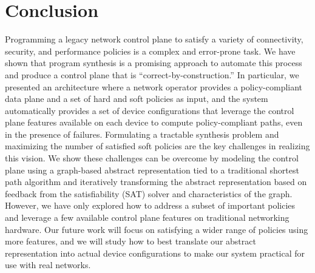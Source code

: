 \section{Conclusion}
Programming a legacy network control plane to satisfy a variety of
connectivity, security, and performance policies is a complex and error-prone
task. We have shown that program synthesis is a promising approach to automate
this process and produce a control plane that is ``correct-by-construction.''
In particular, we presented an architecture where a network operator provides
a policy-compliant data plane and a set of hard and soft policies as input,
and the system automatically provides a set of device configurations that
leverage the control plane features available on each device to compute
policy-compliant paths, even in the presence of failures.  Formulating a
tractable synthesis problem and maximizing the number of satisfied soft
policies are the key challenges in realizing this vision. We show these
challenges can be overcome by modeling the control plane using a graph-based 
abstract representation tied to a traditional shortest path algorithm and
iteratively transforming the abstract representation based on feedback from
the satisfiability (SAT) solver and characteristics of the graph. However, we
have only explored how to address a subset of important policies and leverage a
few available control plane features on traditional networking hardware. Our
future work will focus on satisfying a wider range of policies using more
features, and we will study how to best translate our abstract representation
into actual device configurations to make our system practical for use with
real networks.
